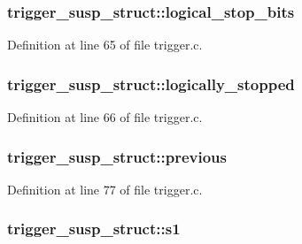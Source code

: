 \subsubsection[{\texorpdfstring{logical\+\_\+stop\+\_\+bits}{logical_stop_bits}}]{ trigger\+\_\+susp\+\_\+struct\+::logical\+\_\+stop\+\_\+bits}\hypertarget{structtrigger__susp__struct_a9200f73e64b6927210245d30adea0974}{}\label{structtrigger__susp__struct_a9200f73e64b6927210245d30adea0974}


Definition at line 65 of file trigger.\+c.

\subsubsection[{\texorpdfstring{logically\+\_\+stopped}{logically_stopped}}]{ trigger\+\_\+susp\+\_\+struct\+::logically\+\_\+stopped}\hypertarget{structtrigger__susp__struct_afe7385c2458f6c1b7c469e75dbfa005d}{}\label{structtrigger__susp__struct_afe7385c2458f6c1b7c469e75dbfa005d}


Definition at line 66 of file trigger.\+c.

\subsubsection[{\texorpdfstring{previous}{previous}}]{ trigger\+\_\+susp\+\_\+struct\+::previous}\hypertarget{structtrigger__susp__struct_a2cf206838b659e8da0fd9eb7b49e5212}{}\label{structtrigger__susp__struct_a2cf206838b659e8da0fd9eb7b49e5212}


Definition at line 77 of file trigger.\+c.

\subsubsection[{\texorpdfstring{s1}{s1}}]{ trigger\+\_\+susp\+\_\+struct\+::s1}\hypertarget{structtrigger__susp__struct_aa241f1b73667b161d9ba1a6980d065e6}{}\label{structtrigger__susp__struct_aa241f1b73667b161d9ba1a6980d065e6}


